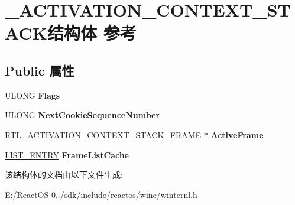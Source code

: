 \hypertarget{struct___a_c_t_i_v_a_t_i_o_n___c_o_n_t_e_x_t___s_t_a_c_k}{}\section{\+\_\+\+A\+C\+T\+I\+V\+A\+T\+I\+O\+N\+\_\+\+C\+O\+N\+T\+E\+X\+T\+\_\+\+S\+T\+A\+C\+K结构体 参考}
\label{struct___a_c_t_i_v_a_t_i_o_n___c_o_n_t_e_x_t___s_t_a_c_k}
\subsection*{Public 属性}
\begin{DoxyCompactItemize}
\item 
\mbox{\label{struct___a_c_t_i_v_a_t_i_o_n___c_o_n_t_e_x_t___s_t_a_c_k_addfb072a96e3d20707b778bf2512cab6}} 
U\+L\+O\+NG {\bfseries Flags}
\item 
\mbox{\label{struct___a_c_t_i_v_a_t_i_o_n___c_o_n_t_e_x_t___s_t_a_c_k_ae504074c38ccfed61a35c9dde65b5fbd}} 
U\+L\+O\+NG {\bfseries Next\+Cookie\+Sequence\+Number}
\item 
\mbox{\label{struct___a_c_t_i_v_a_t_i_o_n___c_o_n_t_e_x_t___s_t_a_c_k_ac45af0813c709f1948b0bd6652d9d85e}} 
\hyperlink{struct___r_t_l___a_c_t_i_v_a_t_i_o_n___c_o_n_t_e_x_t___s_t_a_c_k___f_r_a_m_e}{R\+T\+L\+\_\+\+A\+C\+T\+I\+V\+A\+T\+I\+O\+N\+\_\+\+C\+O\+N\+T\+E\+X\+T\+\_\+\+S\+T\+A\+C\+K\+\_\+\+F\+R\+A\+ME} $\ast$ {\bfseries Active\+Frame}
\item 
\mbox{\label{struct___a_c_t_i_v_a_t_i_o_n___c_o_n_t_e_x_t___s_t_a_c_k_a7b84c804f8992d6e1aac906b7f2a4d2e}} 
\hyperlink{struct___l_i_s_t___e_n_t_r_y}{L\+I\+S\+T\+\_\+\+E\+N\+T\+RY} {\bfseries Frame\+List\+Cache}
\end{DoxyCompactItemize}


该结构体的文档由以下文件生成\+:\begin{DoxyCompactItemize}
\item 
E\+:/\+React\+O\+S-\/0../sdk/include/reactos/wine/winternl.\+h\end{DoxyCompactItemize}
